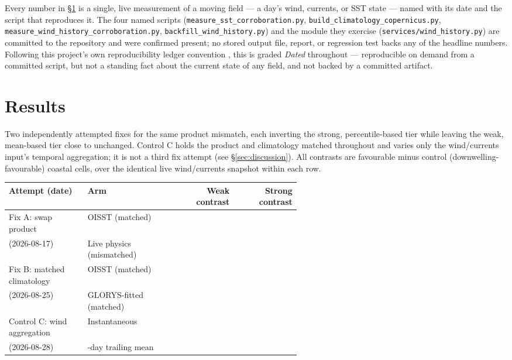 {\raggedright\sloppy
{} Every number in \S\ref{sec:results} is a single, live
measurement of a moving field --- a day's wind, currents, or SST state ---
named with its date and the script that reproduces it. The four named
scripts (\texttt{measure\_sst\_corroboration.py},
\texttt{build\_climatology\_copernicus.py},
\texttt{measure\_wind\_history\_corroboration.py},
\texttt{backfill\_wind\_history.py}) and the module they exercise
(\texttt{services/wind\_history.py}) are committed to the repository and were
confirmed present; no stored output file, report, or regression test backs
any of the headline numbers. Following this project's own reproducibility
ledger convention \citep{silentfailures2026}, this is graded \emph{Dated}
throughout --- reproducible on demand from a committed script, but not a
standing fact about the current state of any field, and not backed by a
committed artifact.\par}

\section{Results}
\label{sec:results}

\begin{wtable}
\centering
\tabscale
\caption{Two independently attempted fixes for the same product mismatch,
each inverting the strong, percentile-based tier while leaving the weak,
mean-based tier close to unchanged. Control C holds the product and
climatology matched throughout and varies only the wind/currents input's
temporal aggregation; it is not a third fix attempt (see
\S\ref{sec:discussion}). All contrasts are favourable minus control
(downwelling-favourable) coastal cells, over the identical live wind/currents
snapshot within each row.}
\label{tab:fixes}
\begin{tabular}{p{0.27\linewidth}p{0.31\linewidth}rr}
\toprule
Attempt (date) & Arm & Weak contrast & Strong contrast \\
\midrule
Fix A: swap product & OISST (matched) & \FixAWeakOisst{} & \FixAStrongOisst{} \\
(2026-08-17) & Live physics (mismatched) & \FixAWeakLive{} & \FixAStrongLive{} \\
\addlinespace
Fix B: matched climatology & OISST (matched) & \FixBWeakOisst{} & \FixBStrongOisst{} \\
(2026-08-25) & GLORYS-fitted (matched) & \FixBWeakGlorys{} & \FixBStrongGlorys{} \\
\addlinespace
Control C: wind aggregation & Instantaneous & \CtrlWeakInstant{} & \CtrlStrongInstant{} \\
(2026-08-28) & \WindHistoryWindowDays{}-day trailing mean & \CtrlWeakTrailing{} & \CtrlStrongTrailing{} \\
\bottomrule
\end{tabular}
\end{wtable}


